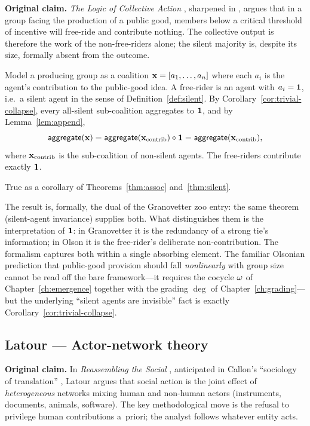 \textbf{Original claim.} \emph{The Logic of Collective Action}
\cite{Olson1965}, sharpened in \cite{Hardin1982}, argues that in a
group facing the production of a public good, members below a
critical threshold of incentive will free-ride and contribute
nothing. The collective output is therefore the work of the
non-free-riders alone; the silent majority is, despite its size,
formally absent from the outcome.

\formalclaim
Model a producing group as a coalition $\mathbf{x} = [a_1, \ldots, a_n]$
where each $a_i$ is the agent's contribution to the public-good
idea. A free-rider is an agent with $a_i = \mathbf{1}$, i.e.~a silent
agent in the sense of Definition~\ref{def:silent}. By
Corollary~\ref{cor:trivial-collapse}, every all-silent
sub-coalition aggregates to $\mathbf{1}$, and by Lemma~\ref{lem:append},
\[
  \mathsf{aggregate}(\mathbf{x}) = \mathsf{aggregate}(\mathbf{x}_{\text{contrib}}) \mathbin{\diamond}
  \mathbf{1} = \mathsf{aggregate}(\mathbf{x}_{\text{contrib}}),
\]
where $\mathbf{x}_{\text{contrib}}$ is the sub-coalition of non-silent
agents. The free-riders contribute exactly $\mathbf{1}$.

\formalstatus
True as a corollary of Theorems~\ref{thm:assoc}
and~\ref{thm:silent}.

\litcomment
The result is, formally, the dual of the Granovetter zoo entry: the
same theorem (silent-agent invariance) supplies both. What
distinguishes them is the interpretation of $\mathbf{1}$: in Granovetter
it is the redundancy of a strong tie's information; in Olson it is
the free-rider's deliberate non-contribution. The formalism captures
both within a single absorbing element. The familiar Olsonian
prediction that public-good provision should fall \emph{nonlinearly}
with group size cannot be read off the bare framework---it requires
the cocycle $\omega$ of Chapter~\ref{ch:emergence} together with the
grading $\deg$ of Chapter~\ref{ch:grading}---but the underlying
``silent agents are invisible'' fact is exactly
Corollary~\ref{cor:trivial-collapse}.

\subsection*{Latour --- Actor-network theory}

\begin{zooentry*}\end{zooentry*}

\textbf{Original claim.} In \emph{Reassembling the Social}
\cite{Latour2005, LatourReassembling2005}, anticipated in Callon's
``sociology of translation'' \cite{Callon1986}, Latour argues that
social action is the joint effect of \emph{heterogeneous} networks
mixing human and non-human actors (instruments, documents, animals,
software). The key methodological move is the refusal to privilege
human contributions a~priori; the analyst follows whatever entity
acts.

